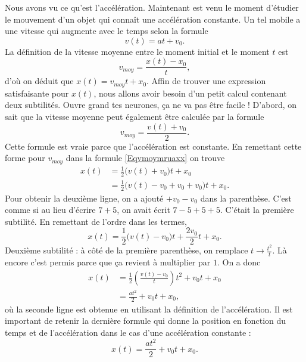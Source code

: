 Nous avons vu ce qu'est l'accélération. Maintenant est venu le moment d'étudier le mouvement d'un objet qui connaît une accélération constante. Un tel mobile a une vitesse qui augmente avec le temps selon la formule
\[ 
  v(t)=at+v_0.
\]
La définition de la vitesse moyenne entre le moment initial et le moment $t$ est 
\begin{equation}		\label{Eqvmoymruaxx}
v_{moy}=\frac{ x(t)-x_0 }{ t },
\end{equation}
d'où on déduit que $x(t)=v_{moy}t+x_0$. Affin de trouver une expression satisfaisante pour $x(t)$, nous allons avoir besoin d'un petit calcul contenant deux subtilités. Ouvre grand tes neurones, ça ne va pas être facile ! D'abord, on sait que la vitesse moyenne peut également être calculée par la formule
\[ 
  v_{moy}=\frac{ v(t)+v_0 }{ 2 }.
\]
Cette formule est vraie parce que l'accélération est constante. En remettant cette forme pour $v_{moy}$ dans la formule \eqref{Eqvmoymruaxx} on trouve
 \begin{equation}
\begin{split}
  x(t)&=\frac{ 1 }{2}\big( v(t)+v_0 \big)t+x_0\\
	&=\frac{ 1 }{2}\big( v(t)-v_0+v_0+v_0 \big)t+x_0.
\end{split}
\end{equation}
Pour obtenir la deuxième ligne, on a ajouté $+v_0-v_0$ dans la parenthèse. C'est comme si au lieu d'écrire $7+5$, on avait écrit $7-5+5+5$. C'était la première subtilité. En remettant de l'ordre dans les termes,
\[ 
  x(t)=\frac{ 1 }{2}\big( v(t)-v_0 \big)t+\frac{ 2v_0 }{ 2 }t+x_0.
\]
Deuxième subtilité : à côté de la première parenthèse, on remplace $t\to \frac{ t^2 }{ t }$. Là encore c'est permis parce que ça revient à multiplier par $1$. On a donc
\[ 
\begin{split}
  x(t)&=\frac{ 1 }{2}\left( \frac{ v(t)-v_0 }{ t } \right) t^2+v_0t+x_0\\
	&=\frac{ at^2 }{ 2 }+v_0t+x_0,
\end{split}
\]
où la seconde ligne est obtenue en utilisant la définition de l'accélération. Il est important de retenir la dernière formule qui donne la position en fonction du temps et de l'accélération dans le cas d'une accélération constante :
\begin{equation}			\label{EqMouvAccatc}
x(t)=\frac{ at^2 }{ 2 }+v_0t+x_0.
\end{equation}

